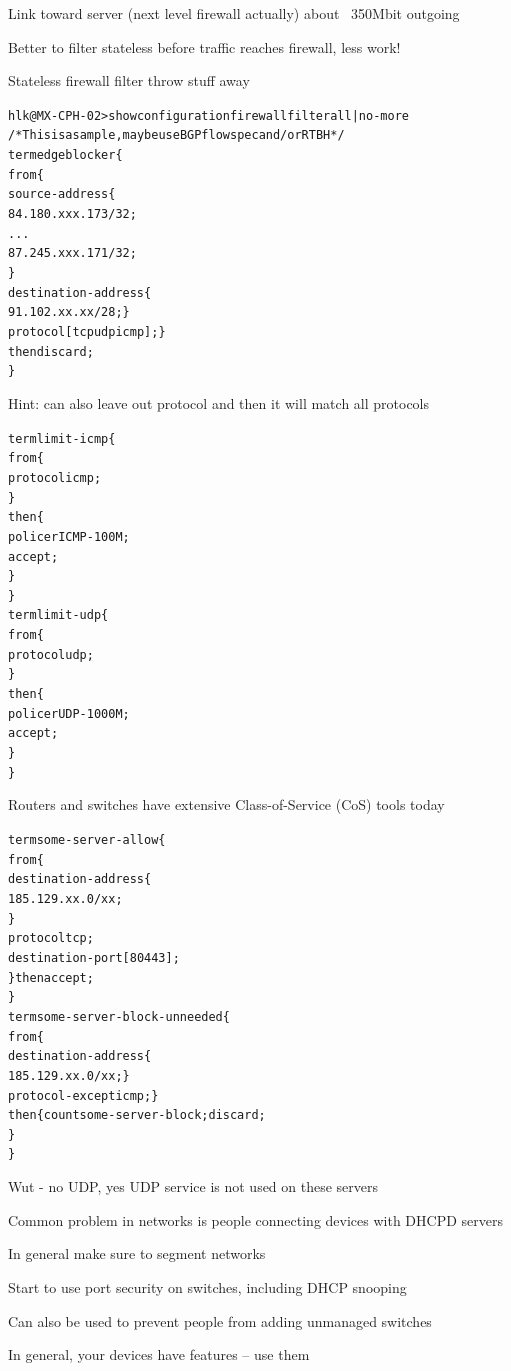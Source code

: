\documentclass[Screen16to9,17pt]{foils}
\begin{document}
\centerline{Link toward server (next level firewall actually) about ~350Mbit outgoing}

Better to filter stateless before traffic reaches firewall, less work!



Stateless firewall filter throw stuff away

\begin{alltt}\footnotesize
hlk@MX-CPH-02> show configuration firewall filter all | no-more
/* This is a sample, maybe use BGP flowspec and/or RTBH */
term edgeblocker \{
    from \{
        source-address \{
            84.180.xxx.173/32;
...
            87.245.xxx.171/32;
        \}
        destination-address \{
            91.102.xx.xx/28; \}
        protocol [ tcp udp icmp ]; \}
    then discard;
\}
\end{alltt}
Hint: can also leave out protocol and then it will match all protocols


\begin{alltt}\footnotesize
term limit-icmp \{
    from \{
        protocol icmp;
    \}
    then \{
        policer ICMP-100M;
        accept;
    \}
\}
term limit-udp \{
    from \{
        protocol udp;
    \}
    then \{
        policer UDP-1000M;
        accept;
    \}
\}
\end{alltt}

Routers and switches have extensive Class-of-Service (CoS) tools today


\begin{alltt}\footnotesize
term some-server-allow \{
    from \{
        destination-address \{
            185.129.xx.0/xx;
        \}
        protocol tcp;
        destination-port [ 80 443 ];
    \} then accept;
\}
term some-server-block-unneeded \{
    from \{
        destination-address \{
            185.129.xx.0/xx; \}
        protocol-except icmp;  \}
    then \{ count some-server-block; discard;
    \}
\}
\end{alltt}

Wut - no UDP, yes UDP service is not used on these servers




\begin{list1}
\item Common problem in networks is people connecting devices with DHCPD servers
\item In general make sure to segment networks
\item Start to use port security on switches, including DHCP snooping\\
\item Can also be used to prevent people from adding unmanaged switches
\item In general, your devices have features -- use them
\end{list1}
\end{document}
